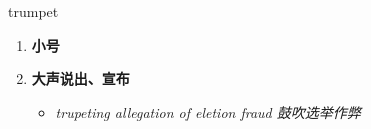 
\begin{frame}
{\huge trumpet}
\begin{center}
\begin{enumerate}\Large
  \item \textbf{小号}
  \item \textbf{大声说出、宣布}
  \begin{itemize}
    \item \em{\Large{trupeting allegation of eletion fraud 鼓吹选举作弊}}
  \end{itemize}
\end{enumerate}
\end{center}
\end{frame}
